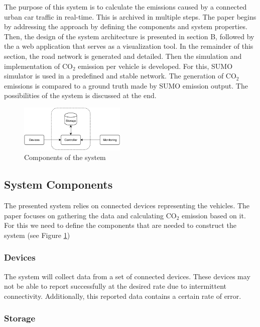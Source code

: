 \documentclass[letter, 10pt, conference]{ieeeconf}
\begin{document}
The purpose of this system is to calculate the emissions caused by a connected urban car traffic in real-time.
This is archived in multiple steps.
The paper begins by addressing the approach by defining the components and system properties.
Then, the design of the system architecture is presented in section B, followed by the a web application that serves as a visualization tool.
In the remainder of this section, the road network is generated and detailed.
Then the simulation and implementation of CO$_2$ emission per vehicle is developed.
For this, SUMO simulator is used in a predefined and stable network.
The generation of CO$_2$ emissions is compared to a ground truth made by SUMO emission output.
The possibilities of the system is discussed at the end.

\begin{figure}[h]
  \centering
  \includegraphics[width=0.45\textwidth]{diagram1}
  \caption{Components of the system}
  \label{fig:diagram1}
\end{figure}

\subsection{System Components}

The presented system relies on connected devices representing the vehicles.
The paper focuses on gathering the data and calculating CO$_2$ emission based on it.
For this we need to define the components that are needed to construct the system (see Figure \ref{fig:diagram1})

\subsubsection{Devices}

The system will collect data from a set of connected devices.
These devices may not be able to report successfully at the desired rate due to intermittent connectivity.
Additionally, this reported data contains a certain rate of error.

\subsubsection{Storage}
\end{document}

